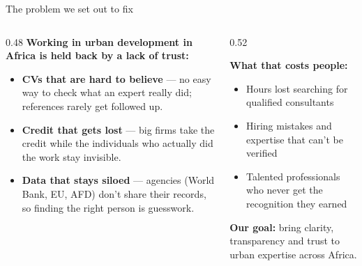 \documentclass[aspectratio=169, 10pt]{beamer}
\newcommand{\keypoint}[1]{%
  \begin{tcolorbox}[enhanced, colback=utlight, colframe=utteal,
    boxrule=0pt, leftrule=3pt, arc=2pt, boxsep=4pt, left=6pt, right=6pt, top=4pt, bottom=4pt]
    \color{utnavy}#1
  \end{tcolorbox}%
}
\begin{document}
\begin{frame}{The problem we set out to fix}
  \begin{columns}[T]
    \begin{column}{0.48\textwidth}
      \textbf{Working in urban development in Africa is held back by a lack of trust:}
      \vspace{4pt}
      \begin{itemize}
        \item \textbf{CVs that are hard to believe} --- no easy way to check what an expert really did; references rarely get followed up.
        \item \textbf{Credit that gets lost} --- big firms take the credit while the individuals who actually did the work stay invisible.
        \item \textbf{Data that stays siloed} --- agencies (World Bank, EU, AFD) don't share their records, so finding the right person is guesswork.
      \end{itemize}
    \end{column}
    \begin{column}{0.52\textwidth}
      \begin{tcolorbox}[enhanced, colback=utlight, colframe=utnavy, boxrule=0pt,
        leftrule=4pt, arc=2pt, boxsep=8pt]
        {\color{utnavy}\textbf{What that costs people:}}\\[2pt]
        \begin{itemize}
          \item Hours lost searching for qualified consultants
          \item Hiring mistakes and expertise that can't be verified
          \item Talented professionals who never get the recognition they earned
        \end{itemize}
      \end{tcolorbox}
      \vspace{4pt}
      \keypoint{\textbf{Our goal:} bring clarity, transparency and trust to urban expertise across Africa.}
    \end{column}
  \end{columns}
\end{frame}
\end{document}
